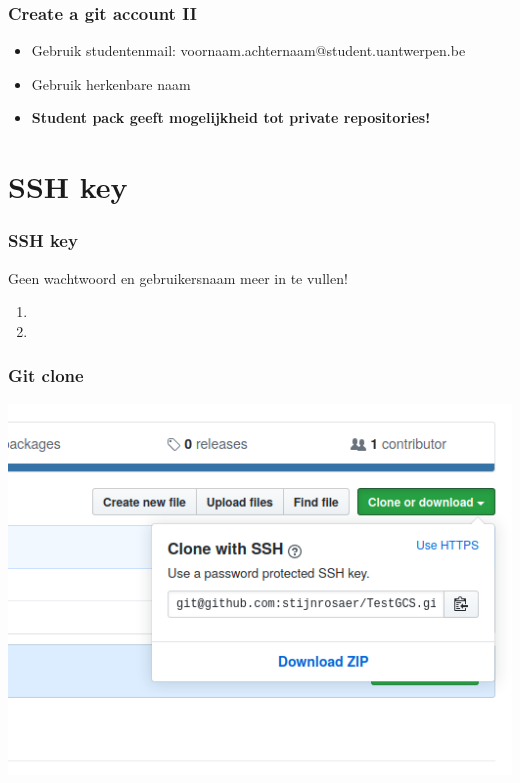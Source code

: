     \begin{frame} 
		\frametitle{Create a git account II}
		\begin{itemize}
			\item Gebruik studentenmail: voornaam.achternaam@student.uantwerpen.be
			\item Gebruik herkenbare naam
		\end{itemize}

	
		\begin{itemize}
			\item \textbf{Student pack geeft mogelijkheid tot private repositories!}
		\end{itemize}
		
	\end{frame}
	
	\section{SSH key}
	\begin{frame}
		\frametitle{SSH key}
		Geen wachtwoord en gebruikersnaam meer in te vullen!
		
		\begin{enumerate}
		\item {}
		
		\item {}
		\end{enumerate}
		
	\end{frame}
	
	\begin{frame}
	\frametitle{Git clone}
	\begin{center}
		\includegraphics[scale=0.5]{res/sshGitRepo.png}
	\end{center}
	
	\end{frame}
	
